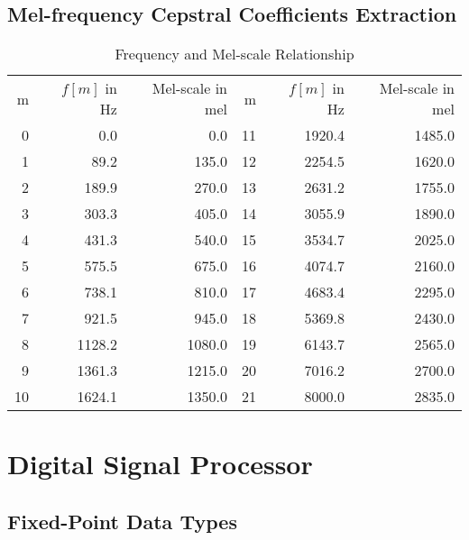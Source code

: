 \subsection{Mel-frequency Cepstral Coefficients Extraction}
\begin{table}[H]
\centering
\caption{Frequency and Mel-scale Relationship}
\label{table:frequency-mel-relationship}
\begin{tabular}{rrr|rrr}
\toprule
m &$f[m]$ in Hz &Mel-scale in mel &m &$f[m]$ in Hz &Mel-scale in mel\\
0  & 0.0    & 0.0    & 11 & 1920.4 & 1485.0 \\
1  & 89.2   & 135.0  & 12 & 2254.5 & 1620.0 \\
2  & 189.9  & 270.0  & 13 & 2631.2 & 1755.0 \\
3  & 303.3  & 405.0  & 14 & 3055.9 & 1890.0 \\
4  & 431.3  & 540.0  & 15 & 3534.7 & 2025.0 \\
5  & 575.5  & 675.0  & 16 & 4074.7 & 2160.0 \\
6  & 738.1  & 810.0  & 17 & 4683.4 & 2295.0 \\
7  & 921.5  & 945.0  & 18 & 5369.8 & 2430.0 \\
8  & 1128.2 & 1080.0 & 19 & 6143.7 & 2565.0 \\
9  & 1361.3 & 1215.0 & 20 & 7016.2 & 2700.0 \\
10 & 1624.1 & 1350.0 & 21 & 8000.0 & 2835.0 \\
\bottomrule
\end{tabular}
\end{table}


\section{Digital Signal Processor}

\subsection{Fixed-Point Data Types}


